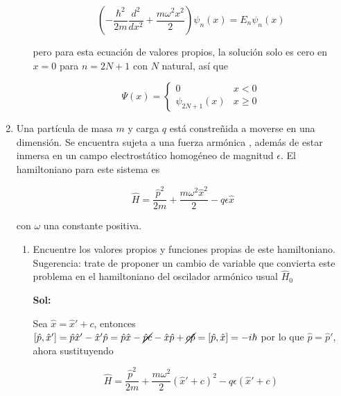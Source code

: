 \documentclass[12pt,a4paper]{article}
\begin{document}
\begin{enumerate}
\begin{enumerate}
    
    \begin{equation*}
        \left(-\frac{\hbar^2}{2m}\frac{d^2}{dx^2}+ \frac{m \omega^2 x^2}{2}\right) \psi_{n} (x) = E_n \psi_{n} (x)
    \end{equation*}
    
    pero para esta ecuación de valores propios, la solución solo es cero en $x=0$ para $n= 2N +1$ con $N$ natural, así que
    
    \begin{equation*}
        \Psi(x) = \left\{\begin{matrix}
    0 & x< 0 \\
    \psi_{2N+1} (x) & x \geq 0
    \end{matrix}\right.
    \end{equation*}
    
\end{enumerate}






\item Una partícula de masa $m$ y carga $q$ está constreñida a moverse en una dimensión. Se encuentra sujeta a una fuerza armónica , además de estar inmersa en un campo electrostático homogéneo de magnitud $\epsilon$. El hamiltoniano para este sistema es

\begin{equation*}
    \hat{H} = \frac{\hat{p}^2}{2m} + \frac{m \omega^2 \hat{x}^2}{2} - q \epsilon \hat{x}
\end{equation*}

con $\omega$ una constante positiva.

\begin{enumerate}
    \item Encuentre los valores propios y funciones propias de este hamiltoniano. Sugerencia: trate de proponer un cambio de variable que convierta este problema en el hamiltoniano  del oscilador armónico usual $\hat{H}_0$
    
    \textbf{Sol:}
    
    Sea $\hat{x} = \hat{x}' + c$, entonces $[\hat{p},\hat{x}'] = \hat{p}\hat{x}' - \hat{x}'\hat{p} = \hat{p} \hat{x} - \cancel{\hat{p}c} - \hat{x} \hat{p} + \cancel{c\hat{p}} = [\hat{p},\hat{x}] = - i\hbar$ por lo que $\hat{p} = \hat{p}'$, ahora sustituyendo
    
    \begin{equation*}
        \hat{H} = \frac{\hat{p}^2}{2m} + \frac{m \omega^2}{2}(\hat{x}' + c)^2 - q\epsilon (\hat{x}' + c)
    \end{equation*}
    

\end{enumerate}
\end{enumerate}
\end{document}
